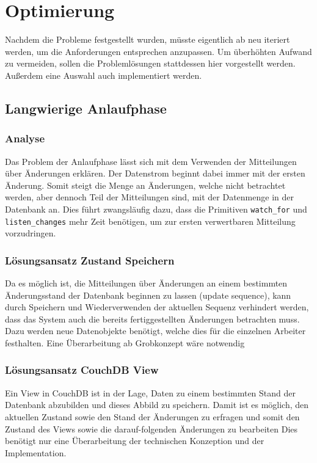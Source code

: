 \chapter{Optimierung}

Nachdem die Probleme festgestellt wurden,
müsste eigentlich ab  neu iteriert werden,
um die Anforderungen entsprechen anzupassen.
Um überhöhten Aufwand zu vermeiden,
sollen die Problemlösungen stattdessen hier vorgestellt werden.
Außerdem eine Auswahl auch implementiert werden.

\section{Langwierige Anlaufphase}

\subsection{Analyse}

Das Problem der Anlaufphase lässt sich mit dem Verwenden der Mitteilungen über Änderungen erklären. Der Datenstrom beginnt dabei immer mit der ersten Änderung.
Somit steigt die Menge an Änderungen, welche nicht betrachtet werden, aber dennoch Teil der Mitteilungen sind, mit der Datenmenge in der Datenbank an.
Dies führt zwangsläufig dazu, dass die Primitiven \verb|watch_for| und \verb|listen_changes| mehr Zeit benötigen, um zur ersten verwertbaren Mitteilung vorzudringen.


\subsection{Lösungsansatz Zustand Speichern}

Da es möglich ist, die Mitteilungen über Änderungen an einem bestimmten Änderungsstand der Datenbank beginnen zu lassen (update sequence),
kann durch Speichern und Wiederverwenden der aktuellen Sequenz verhindert werden,
dass das System auch die bereits fertiggestellten Änderungen betrachten muss.
Dazu werden neue Datenobjekte benötigt, welche dies für die einzelnen Arbeiter festhalten. Eine Überarbeitung ab Grobkonzept wäre notwendig


\subsection{Lösungsansatz CouchDB View}

Ein View in CouchDB ist in der Lage, Daten zu einem bestimmten Stand der Datenbank abzubilden und dieses Abbild zu speichern.
Damit ist es möglich, den aktuellen Zustand sowie den Stand der Änderungen zu erfragen und somit den Zustand des Views sowie die darauf-folgenden Änderungen zu bearbeiten 
Dies benötigt nur eine Überarbeitung der technischen Konzeption und der Implementation.


